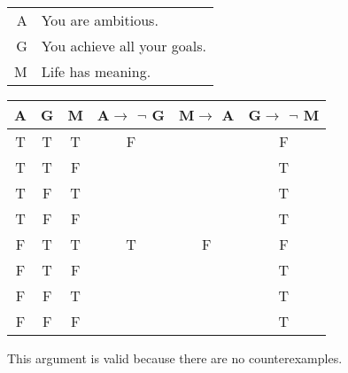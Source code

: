 \begin{tabular}{r l}
    A & You are ambitious. \\
    G & You achieve all your goals. \\
    M & Life has meaning.
\end{tabular}

\begin{tabular}{c|c|c||c|c||c}
    A & G & M & A$\rightarrow$ $\lnot$ G & M$\rightarrow$ A & G$\rightarrow$ $\lnot$ M \\
    \hline
    T & T & T & F &   & F \\
    T & T & F &   &   & T \\
    T & F & T &   &   & T \\
    T & F & F &   &   & T \\
    F & T & T & T & F & F \\
    F & T & F &   &   & T \\
    F & F & T &   &   & T \\
    F & F & F &   &   & T
\end{tabular}

\noindent This argument is valid because there are no counterexamples.